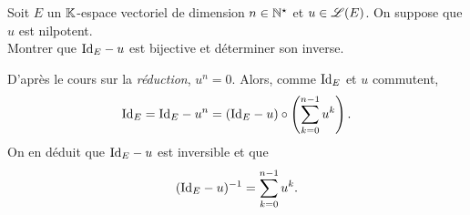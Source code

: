 \begin{exercice}
    Soit $E$ un $\mathbb{K}$-espace vectoriel de dimension $n \in \mathbb{N}^\star$ et $u \in \mathscr{L}(E)$. On suppose que $u$ est nilpotent. \\
    Montrer que $\mathrm{Id}_E - u$ est bijective et déterminer son inverse.
\end{exercice}

\begin{solution}
    D'après le cours sur la \emph{réduction}, $u^n = 0$. Alors, comme $\mathrm{Id}_E$ et $u$ commutent, 
    $$\mathrm{Id}_E = \mathrm{Id}_E - u^n = (\mathrm{Id}_E - u) \circ \left( \sum_{k = 0}^{n-1} u^k \right).$$
    On en déduit que $\mathrm{Id}_E - u$ est inversible et que 
    $$(\mathrm{Id}_E - u)^{-1} = \sum_{k = 0}^{n-1} u^k.$$
\end{solution}